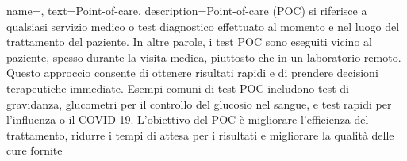  {
    name=,
    text=Point-of-care,
    description={Point-of-care (POC) si riferisce a qualsiasi servizio medico o test diagnostico effettuato al momento e nel luogo del trattamento del paziente. In altre parole, i test POC sono eseguiti vicino al paziente, spesso durante la visita medica, piuttosto che in un laboratorio remoto. Questo approccio consente di ottenere risultati rapidi e di prendere decisioni terapeutiche immediate. Esempi comuni di test POC includono test di gravidanza, glucometri per il controllo del glucosio nel sangue, e test rapidi per l'influenza o il COVID-19. L'obiettivo del POC è migliorare l'efficienza del trattamento, ridurre i tempi di attesa per i risultati e migliorare la qualità delle cure fornite}
}